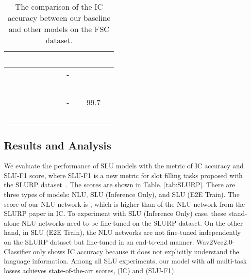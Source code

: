 \documentclass{article}
\begin{document}
\begin{table}[pt!] \begin{center} 
\caption{\label{tab:FSC}The comparison of the IC accuracy between our baseline and other models on the FSC dataset.}
\vspace{-2mm}\begin{adjustbox}{width=0.8\linewidth}
    \begin{threeparttable}
    \begin{tabular}{l|cccc}
    \toprule
    
    ~~~~ & ~~~~ & ~~~~ & ~~~~ \\
    \midrule
    ~~~~ & ~~~~ & - &   \\
    ~~~~ & ~~~~ &  &   \\
    ~~~~ & ~~~~ & - & 99.7 \\
    \midrule
    ~~~~ & ~~~~ &  &   \\
    
    \bottomrule
    \end{tabular}
    \end{threeparttable}
\end{adjustbox}
\end{center}
\vspace{-10mm}\end{table}



\vspace{-4mm}
\subsection{Results and Analysis}
We evaluate the performance of SLU models with the metric of IC accuracy and SLU-F1 score, where SLU-F1 is a new metric for slot filling tasks proposed with the SLURP dataset~\cite{bastianelli2020slurp}.
The scores are shown in Table. \ref{tab:SLURP}.
There are three types of models: NLU, SLU (Inference Only), and SLU (E2E Train).
The score of our NLU network is , which is higher than  of the NLU network from the SLURP paper in IC.
To experiment with SLU (Inference Only) case, these stand-alone NLU networks need to be fine-tuned on the SLURP dataset.
On the other hand, in SLU (E2E Train), the NLU networks are not fine-tuned independently on the SLURP dataset but fine-tuned in an end-to-end manner.
Wav2Vec2.0-Classifier only shows  IC accuracy because it does not explicitly understand the language information.
Among all SLU experiments, our model with all multi-task losses achieves state-of-the-art scores,  (IC) and  (SLU-F1).
\end{document}

